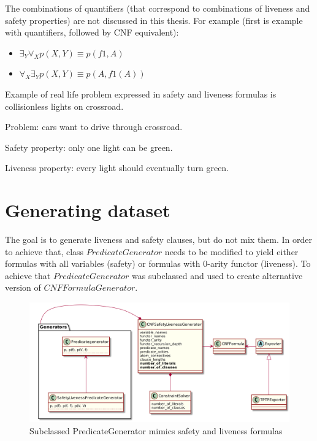 The combinations of quantifiers (that correspond to combinations of liveness and safety properties) are not discussed in this thesis. For example (first is example with quantifiers, followed by CNF equivalent):
\begin{itemize}
\item $\exists_Y \forall_X p(X, Y) \equiv p(f1, A)$
\item $\forall_X \exists_Y p(X, Y) \equiv p(A,f1(A)) $
\end{itemize}

Example of real life problem expressed in safety and liveness formulas is collisionless lights on crossroad.

\noindent
Problem: cars want to drive through crossroad.

\noindent
Safety property: only one light can be green.

\noindent
Liveness property: every light should eventually turn green.

\section{Generating dataset}

The goal is to generate liveness and safety clauses, but do not mix them. In order to achieve that, class $PredicateGenerator$ needs to be modified to yield either formulas with all variables (safety) or formulas with 0-arity functor (liveness). To achieve that $PredicateGenerator$ was subclassed and used to create alternative version of $CNFFormulaGenerator$.

\begin{figure}[H]
\begin{centering}
  \includegraphics[width=\textwidth]{logic-formula-generator/fol/safety_liveness_predicate_generator.png}
  \caption{Subclassed PredicateGenerator mimics safety and liveness formulas}
\end{centering}
\end{figure}

